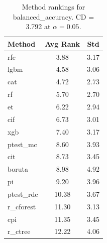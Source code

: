 \begin{table}[h]
\centering
\caption{Method rankings for balanced_accuracy. CD = 3.792 at $\alpha=0.05$.}
\label{tab:ranks_balanced_accuracy}
\begin{tabular}{lcc}
\toprule
Method & Avg Rank & Std \\
\midrule
rfe & 3.88 & 3.17 \\
lgbm & 4.58 & 3.06 \\
cat & 4.72 & 2.73 \\
rf & 5.70 & 2.70 \\
et & 6.22 & 2.94 \\
cif & 6.73 & 3.01 \\
xgb & 7.40 & 3.17 \\
ptest_mc & 8.60 & 3.93 \\
cit & 8.73 & 3.45 \\
boruta & 8.98 & 4.92 \\
pi & 9.20 & 3.96 \\
ptest_rdc & 10.38 & 3.67 \\
r_cforest & 11.30 & 3.13 \\
cpi & 11.35 & 3.45 \\
r_ctree & 12.22 & 4.06 \\
\bottomrule
\end{tabular}
\end{table}